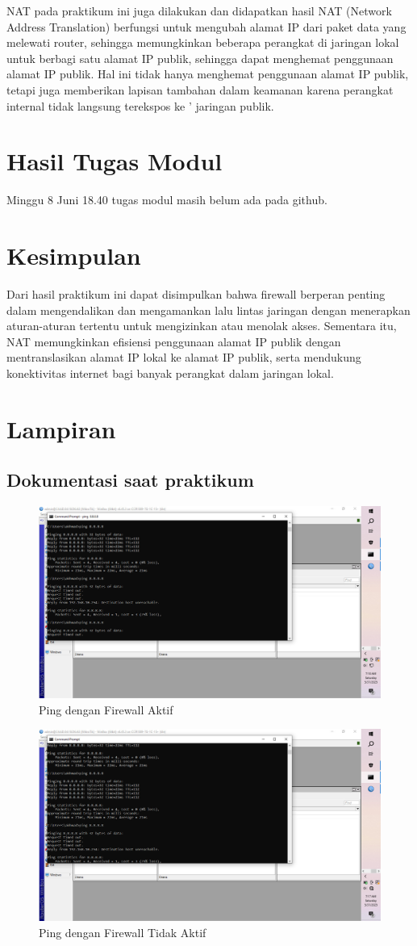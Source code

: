 NAT pada praktikum ini juga dilakukan dan didapatkan hasil NAT (Network Address Translation) berfungsi untuk mengubah alamat IP dari paket data yang melewati router,
sehingga memungkinkan beberapa perangkat di jaringan lokal untuk berbagi satu alamat IP publik, sehingga dapat
menghemat penggunaan alamat IP publik. Hal ini tidak hanya menghemat penggunaan alamat IP publik, tetapi juga 
memberikan lapisan tambahan dalam keamanan karena perangkat internal tidak langsung terekspos ke '
jaringan publik.



\section{Hasil Tugas Modul}
Minggu 8 Juni 18.40 tugas modul masih belum ada pada github.

\section{Kesimpulan}
Dari hasil praktikum ini dapat disimpulkan bahwa firewall berperan penting dalam mengendalikan dan 
mengamankan lalu lintas jaringan dengan menerapkan aturan-aturan tertentu untuk mengizinkan atau 
menolak akses. Sementara itu, NAT memungkinkan efisiensi penggunaan alamat IP publik dengan 
mentranslasikan alamat IP lokal ke alamat IP publik, serta mendukung konektivitas internet bagi 
banyak perangkat dalam jaringan lokal.


\section{Lampiran}
\subsection{Dokumentasi saat praktikum}
    \begin{figure}[H]
        \centering
        \includegraphics[width=0.5\linewidth]{gambar8a.jpeg}
        \caption{Ping dengan Firewall Aktif}
        \label{fig:ping-saat-firewall-aktif}
    \end{figure}

    \begin{figure}[H]
        \centering
        \includegraphics[width=0.5\linewidth]{gambar8b.jpeg}
        \caption{Ping dengan Firewall Tidak Aktif}
        \label{fig:ping-saat-firewall-tidak-aktif}
    \end{figure}


